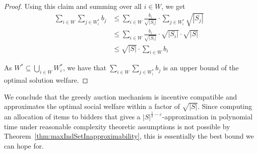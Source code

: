 \begin{proof}
	Using this claim and summing over all $i \in W$, we get
	\begin{equation*}
		\begin{split}
			\sum_{i \in W} \sum_{j \in W^*_i} b_j & \le \sum_{i \in W}
			\frac{b_i}{\sqrt{|S_i|}} \cdot \sum_{j \in W^*_i}
			\sqrt{|S_j|} \\
			& \le \sum_{i \in W} \frac{b_i}{\sqrt{|S_i|}}
			\cdot \sqrt{|S_i|} \cdot \sqrt{|S|} \\
			& \le \sqrt{|S|} \cdot \sum_{i \in W} b_i
		\end{split}
	\end{equation*}

	As $W^* \subseteq \bigcup_{i \in W} W^*_i$, we have that $\sum_{i \in W}
	\sum_{j \in W^*_i} b_j$ is an upper bound of the optimal solution welfare.
\end{proof}

We conclude that the greedy auction mechanism is incentive compatible and
approximates the optimal social welfare within a factor of $\sqrt{|S|}$. Since
computing an allocation of items to bidders that gives a $|S|^{\frac{1}{2} -
\varepsilon}$-approximation in polynomial time under reasonable complexity
theoretic assumptions is not possible by
Theorem~\ref{thm:maxIndSetInapproximability}, this is essentially the best
bound we can hope for.
